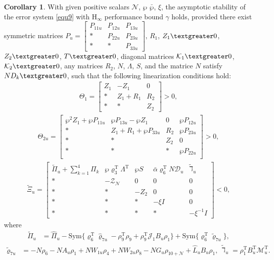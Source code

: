 \documentclass[preprint,review,fleqn,sort&compress,3p]{elsarticle}
\theoremstyle{definition}%
\newtheorem{cor}{Corollary}[section]
\begin{document}
\begin{cor}\label{cor1}
		With given positive scalars  $\mathcal{N}$, $ \wp$ $\bar{\wp}$, $\xi $, the asymptotic stability of the error system \eqref{equ9} with $ \text{H}_{\infty} $ performance bound $\gamma$ holds, provided there exist symmetric matrices $P_u=\begin{bmatrix}
		P_{11u} & P_{12u} & P_{13u} \\
		* & P_{22u} & P_{23u} \\
		* & * & P_{33u}
	\end{bmatrix}$, $R_1$, $Z_1 \textgreater 0$, $Z_2 \textgreater 0$, $T \textgreater 0 $, diagonal matrices $\mathcal{K}_1 \textgreater 0$, $\mathcal{K}_2 \textgreater 0$, any matrices  $R_2$, $N$, $\Lambda$, $S$, and the matrice $N$ satisfy $N D_k \textgreater 0$, such that the following linearization conditions hold:
	\begin{align}\label{equ50}
		\Theta_1 = \begin{bmatrix}
			Z_1 & -Z_1 & 0 \\
			* & Z_1 + R_1 & R_2 \\
			* & * & Z_2
		\end{bmatrix} > 0,
	\end{align}
	\begin{align}\label{equ51}
		\Theta_{2u} = \begin{bmatrix}
			\wp^2 Z_1 + \wp P_{11u} & \wp P_{13u} - \wp Z_1 & 0 & \wp P_{12u} \\
			* & Z_1 + R_1 + \wp P_{33u} & R_2 & \wp P_{23u} \\
			* & *& Z_2 & 0 \\
			* & * & * & \wp P_{22u} \\
		\end{bmatrix} > 0,
	\end{align}
	\begin{align}\label{equ52}
		\tilde{\Xi}_u = \begin{bmatrix}
			\tilde{\Pi}_u+\sum_{k=1}^4 \Pi_k & \wp\varrho^\text{T}_3 \Lambda^\text{T} & \wp S & \bar{\alpha}\varrho_6^\text{T} N \mathcal{D}_u & \tilde{\daleth}_u\\
			* & -\mathcal{Z}_\mathcal{N} & 0 & 0 &0 \\
			* & * & -Z_2 & 0 & 0\\
			* & * &* & -\xi I & 0\\
			* & * &* & * & -\xi^{-1} I
		\end{bmatrix} < 0,
	\end{align}
	where
	\begin{align*}
		\tilde{\Pi}_u&=\hat{\Pi}_u - \text{Sym} \{\varrho_6^\text{T} \hat{\varrho}_{7u} - \rho_{9}^\text{T} \rho_{9} + \rho_{9}^\text{T} \mathcal{J}_1 B_u \rho_1 \} + \text{Sym} \{\varrho_6^\text{T} \tilde{\varrho}_{7u} \},
	\end{align*}
	\begin{align*}
		\tilde{\varrho}_{7u} &=-N \rho_6 - N A_u \rho_1 + N W_{1u} \rho_4 + N W_{2u} \rho_8 - N G_u \rho_{10+\mathcal{N}} + \hat{L}_u B_u \rho_1,\, \tilde{\daleth}_u= \rho_1 ^\text{T} B_u^\text{T} \mathcal{M}_u^\text{T}.
	\end{align*}
	

\end{cor}
\end{document}
